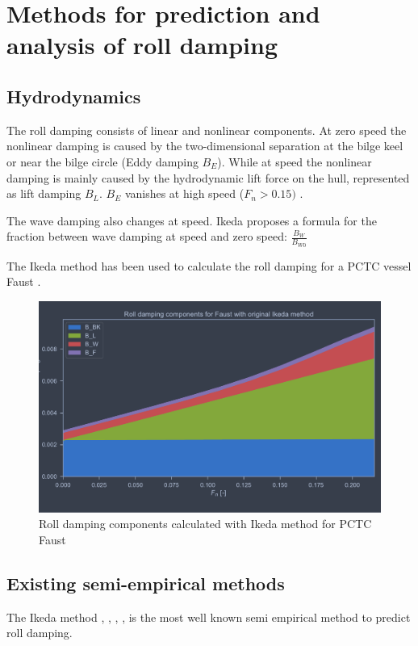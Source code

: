 \section{Methods for prediction and analysis of roll damping}
\label{se:methods_for_prediction_and_analysis}

\subsection{Hydrodynamics}
\label{se:hydrodynamics}
The roll damping consists of linear and nonlinear components. At zero speed the nonlinear damping is caused by the two-dimensional separation at the bilge keel or near the bilge circle (Eddy damping $B_E$). While at speed the nonlinear damping is mainly caused by the hydrodynamic lift force on the hull, represented as lift damping $B_L$. $B_E$ vanishes at high speed ($F_n>0.15)$ \cite{ikeda_components_1978}.

The wave damping also changes at speed. Ikeda \cite{ikeda_components_1978} proposes a formula for the fraction between wave damping at speed and zero speed: $\frac{B_W}{B_{W0}}$

The Ikeda method has been used to calculate the roll damping for a PCTC vessel Faust \cite{soder_assessment_2019}.
\begin{figure}[h]
    \centering
    \includegraphics[width=\columnwidth]{figures/ikeda_faust.pdf}
    \caption{Roll damping components calculated with Ikeda method for PCTC Faust}
    \label{fig:ikeda_faust}
\end{figure}

\subsection{Existing semi-empirical methods}
The Ikeda method \cite{ikeda_roll_1978}, \cite{ikeda_eddy_1978}, \cite{ikeda_roll_1979}, \cite{ikeda_components_1978}, \cite{ikeda_velocity_1979} is the most well known semi empirical method to predict roll damping. 

